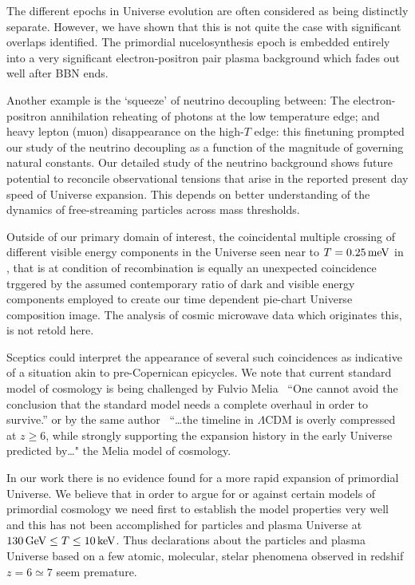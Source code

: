 The different epochs in Universe evolution are often considered as being distinctly separate. However, we have shown that this is not quite the case with significant overlaps identified. The primordial nucelosynthesis  epoch is embedded entirely into a very significant electron-positron pair plasma background which fades out well after BBN ends. 

Another example is the `squeeze' of neutrino decoupling between: The electron-positron annihilation reheating of photons at the low temperature edge; and heavy lepton (muon) disappearance on the  high-$T$ edge: this finetuning prompted our study of the neutrino decoupling as a function of the magnitude of governing natural constants. Our detailed study of the neutrino background shows future potential  to reconcile observational tensions that arise in the reported present day speed of Universe expansion. This depends on better understanding of the dynamics of free-streaming particles across mass thresholds. 

Outside of our primary domain of interest, the coincidental multiple crossing of different visible energy components in the Universe seen near to $T=0.25\text{\,meV}$ in , that is at condition of recombination is equally an unexpected coincidence trggered by the assumed contemporary ratio of dark and visible energy components employed to create our time dependent pie-chart Universe composition image. The analysis of cosmic microwave data which originates this, is not retold here.

Sceptics could interpret the appearance of several such coincidences as indicative of a situation akin to pre-Copernican epicycles. We note that current standard model of cosmology is being challenged by Fulvio Melia~\cite{Melia:2022itm} ``One cannot avoid the conclusion that the standard model needs a complete overhaul in order to survive.'' or by the same author~\cite{Melia:2024rzy}  ``\ldots the timeline in $\Lambda$CDM is overly compressed at $z\ge 6$, while strongly supporting the expansion history in the early Universe predicted by\ldots" the Melia model of cosmology. 

In our work there is no evidence found for a more rapid expansion of primordial Universe. We believe that in order to argue for or against certain models of primordial cosmology  we need first to establish the model properties very well and this has not been accomplished for particles and plasma Universe at $130\text{\,GeV}\le T\le 10\text{\,keV}$. Thus declarations about the particles and plasma Universe  based on a few  atomic, molecular, stelar phenomena observed in redshif $z=6\simeq7$ seem premature. 


